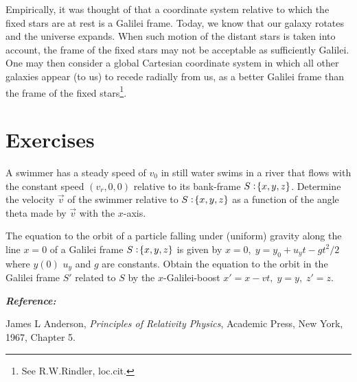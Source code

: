 \vspace{.2cm}
Empirically, it was thought of that a coordinate system 
relative to which the fixed stars are at rest is a Galilei 
frame. Today, we know that our galaxy rotates and the 
universe expands. When such motion of the distant stars is 
taken into account, the frame of the fixed stars may not be 
acceptable as sufficiently Galilei. One may then consider a 
global Cartesian coordinate system in which all other 
galaxies appear (to us) to recede radially from us, as a 
better Galilei frame than the frame of the fixed 
stars\footnote{See R.W.Rindler, loc.cit.}.

\vspace{-.2cm}

\section*{Exercises}

\exise A swimmer has a steady speed of $v_0$ in still water 
swims in a river that flows with the constant speed 
$(v_r,0,0)$ relative to its  bank-frame $S:\negthinspace\{x,y,z\}$. 
Determine the velocity $\vec{v}$ of the swimmer relative to 
 $S:\negthinspace\{x,y,z\}$ as a function of the angle theta made by 
$\vec{v}$ with the $x$-axis.

\exise The equation to the orbit of a particle falling under 
(uniform) gravity along the line $x =0$ of a Galilei frame 
$S:\negthinspace\{x,y,z\}$  is given by $x=0,\; y=y_0+u_yt-gt^2/2$ 
where $y(0)$ $u_y$ and $g$ are constants. Obtain the 
equation to the orbit in the Galilei frame $S'$ related to 
$S$ by the $x$-Galilei-boost $x'=x-vt,\;y=y,\;z'=z$.

\vspace{.2cm}
{\bf{\textit{Reference:}}}

James L Anderson, \textsl{Principles of Relativity
Physics}, Academic Press, New York, 1967, Chapter 5.

